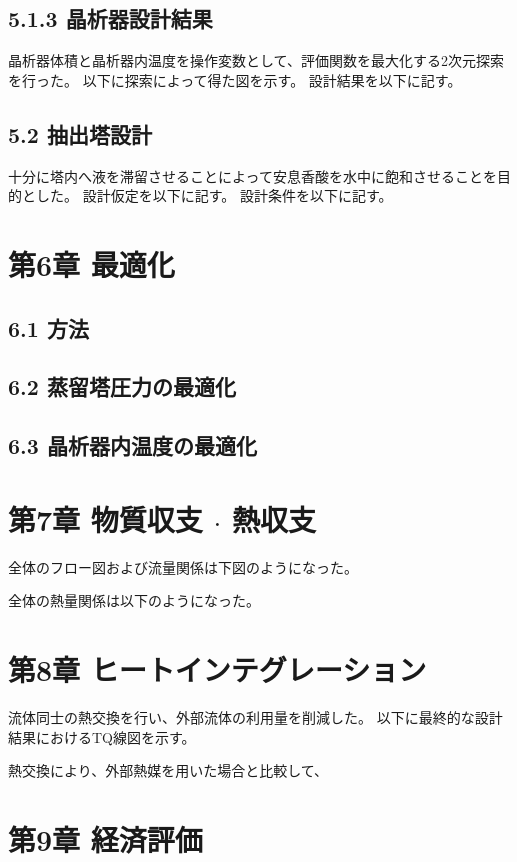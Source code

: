 \documentclass[platex, a4j]{jsarticle}
\begin{document}
\subsection*{5.1.3 晶析器設計結果}
晶析器体積と晶析器内温度を操作変数として、評価関数を最大化する2次元探索を行った。
以下に探索によって得た図を示す。
設計結果を以下に記す。

\subsection*{5.2 抽出塔設計}
十分に塔内へ液を滞留させることによって安息香酸を水中に飽和させることを目的とした。
設計仮定を以下に記す。
設計条件を以下に記す。

\newpage
\section*{第6章 最適化}
\subsection*{6.1 方法}

\subsection*{6.2 蒸留塔圧力の最適化}

\subsection*{6.3 晶析器内温度の最適化}

\newpage
\section*{第7章 物質収支 $\cdot$ 熱収支}
全体のフロー図および流量関係は下図のようになった。

全体の熱量関係は以下のようになった。

\newpage
\section*{第8章 ヒートインテグレーション}
流体同士の熱交換を行い、外部流体の利用量を削減した。
以下に最終的な設計結果におけるTQ線図を示す。

熱交換により、外部熱媒を用いた場合と比較して、

\newpage
\section*{第9章 経済評価}
\end{document}

